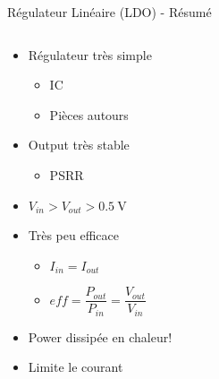 \begin{frame}{Régulateur Linéaire (LDO) - Résumé}
    \begin{columns}
        \begin{column}{0.5\textwidth}
            \vspace{-24pt}
            \begin{itemize}
                \item<1-> Régulateur très simple
                \begin{itemize}
                    \item<1-> IC
                    \item<1-> Pièces autours
                \end{itemize}
                \item<2-> Output très stable
                \begin{itemize}
                    \item<2-> PSRR
                \end{itemize}
                \item<3-> $V_{in} > V_{out} > \SI{0.5}{\volt}$
                \item<4-> Très peu efficace
                \begin{itemize}
                    \setlength{\itemsep}{4pt}
                    \item<4-> $I_{in} = I_{out}$
                    \item<4-> $eff = \dfrac{P_{out}}{P_{in}} = \dfrac{V_{out}}{V_{in}}$
                \end{itemize}
                \item<5-> Power dissipée en chaleur!
                \item<5-> Limite le courant
            \end{itemize}
        \end{column}


\end{columns}
\end{frame}
